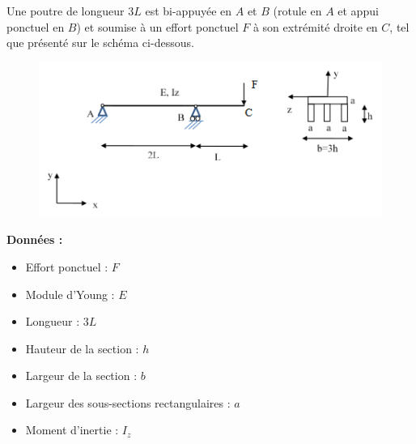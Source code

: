 \documentclass[lecture.tex]{subfiles}
\begin{document}
\exercice{}

Une poutre de longueur $3L$ est bi-appuyée en $A$ et $B$ (rotule en $A$ et appui ponctuel en $B$) et soumise à un effort ponctuel $F$ à son extrémité droite en $C$, tel que présenté sur le schéma ci-dessous.

\begin{figure}[h!]
  \centering
  \includegraphics[scale=1.1]{fig1-rdm-0060.png}
\end{figure}

\medskip

\textbf{Données :}

\begin{itemize}[label =, font =\tiny ]
  \item Effort ponctuel : $F$
  \item Module d'Young : $E$
  \item Longueur : $3L$
  \item Hauteur de la section : $h$
  \item Largeur de la section : $b$
  \item Largeur des sous-sections rectangulaires : $a$
  \item Moment d'inertie : $I_z$
\end{itemize}

\bigskip
\end{document}
